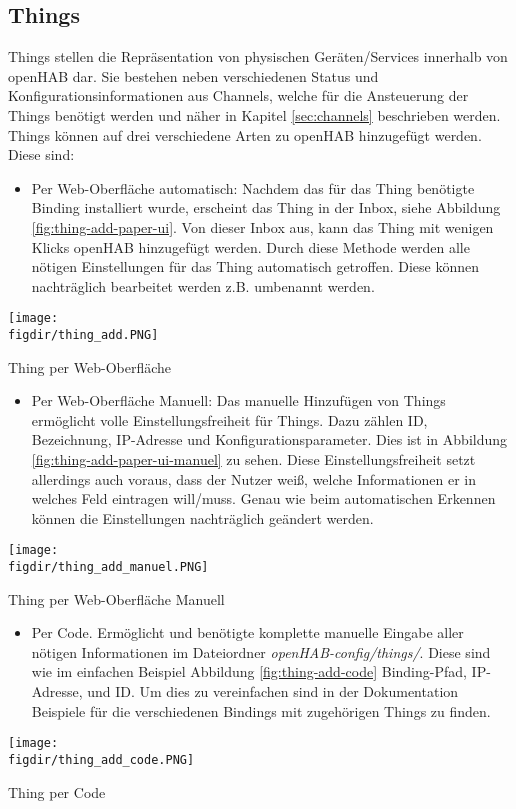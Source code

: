 \subsection{Things}
Things stellen die Repräsentation von physischen Geräten/Services innerhalb von openHAB dar. Sie bestehen neben verschiedenen Status und Konfigurationsinformationen aus Channels, welche für die Ansteuerung der Things benötigt werden und näher in Kapitel \ref{sec:channels} beschrieben werden.
Things können auf drei verschiedene Arten zu openHAB hinzugefügt werden. Diese sind:
\begin{itemize}
	\item Per Web-Oberfläche automatisch: Nachdem das für das Thing benötigte Binding installiert wurde, erscheint das Thing in der Inbox, siehe Abbildung \ref{fig:thing-add-paper-ui}. Von dieser Inbox aus, kann das Thing mit wenigen Klicks openHAB hinzugefügt werden. Durch diese Methode werden alle nötigen Einstellungen für das Thing automatisch getroffen. Diese können nachträglich bearbeitet werden z.B. umbenannt werden. 
\end{itemize}
{
	\centering
	\captionsetup{type=figure}
	\texttt{[image: \\figdir/thing\_add.PNG]}
	\caption{Thing per Web-Oberfläche \label{fig:thing-add-paper-ui}}
}	
\begin{itemize}	
	\item Per Web-Oberfläche Manuell: Das manuelle Hinzufügen von Things ermöglicht volle Einstellungsfreiheit für Things. Dazu zählen ID, Bezeichnung, IP-Adresse und Konfigurationsparameter. Dies ist in Abbildung \ref{fig:thing-add-paper-ui-manuel} zu sehen. Diese Einstellungsfreiheit setzt allerdings auch voraus, dass der Nutzer weiß, welche Informationen er in welches Feld eintragen will/muss. Genau wie beim automatischen Erkennen können die Einstellungen nachträglich geändert werden. 
\end{itemize}
{
	\centering
	\captionsetup{type=figure}
	\texttt{[image: \\figdir/thing\_add\_manuel.PNG]}
	\caption{Thing per Web-Oberfläche Manuell \label{fig:thing-add-paper-ui-manuel}}
}
\begin{itemize}	
	\item Per Code. Ermöglicht und benötigte komplette manuelle Eingabe aller nötigen Informationen im Dateiordner  \textit{openHAB-config/things/}. Diese sind wie im einfachen Beispiel Abbildung \ref{fig:thing-add-code} Binding-Pfad, IP-Adresse, und ID. Um dies zu vereinfachen sind in der Dokumentation Beispiele für die verschiedenen Bindings mit zugehörigen Things zu finden.
\end{itemize}
{
	\centering
	\captionsetup{type=figure}
	\texttt{[image: \\figdir/thing\_add\_code.PNG]}
	\caption{Thing per Code \label{fig:thing-add-code}}
}


